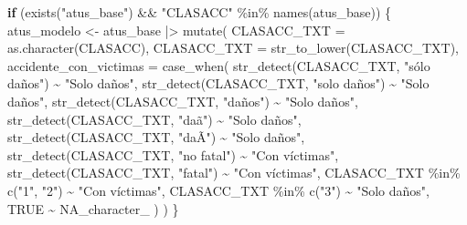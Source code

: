\documentclass[
  11pt,
  letterpaper,
]{book}
\newenvironment{Shaded}{\begin{snugshade}}{\end{snugshade}}
\newcommand{\AttributeTok}[1]{\textcolor[rgb]{0.40,0.45,0.13}{#1}}
\newcommand{\ConstantTok}[1]{\textcolor[rgb]{0.56,0.35,0.01}{#1}}
\newcommand{\ControlFlowTok}[1]{\textcolor[rgb]{0.00,0.23,0.31}{\textbf{#1}}}
\newcommand{\FunctionTok}[1]{\textcolor[rgb]{0.28,0.35,0.67}{#1}}
\newcommand{\NormalTok}[1]{\textcolor[rgb]{0.00,0.23,0.31}{#1}}
\newcommand{\OtherTok}[1]{\textcolor[rgb]{0.00,0.23,0.31}{#1}}
\newcommand{\SpecialCharTok}[1]{\textcolor[rgb]{0.37,0.37,0.37}{#1}}
\newcommand{\StringTok}[1]{\textcolor[rgb]{0.13,0.47,0.30}{#1}}
\begin{document}
\begin{Shaded}
\begin{Highlighting}[]
\ControlFlowTok{if}\NormalTok{ (}\FunctionTok{exists}\NormalTok{(}\StringTok{"atus\_base"}\NormalTok{) }\SpecialCharTok{\&\&} \StringTok{"CLASACC"} \SpecialCharTok{\%in\%} \FunctionTok{names}\NormalTok{(atus\_base)) \{}
\NormalTok{  atus\_modelo }\OtherTok{\textless{}{-}}\NormalTok{ atus\_base }\SpecialCharTok{|\textgreater{}}
    \FunctionTok{mutate}\NormalTok{(}
      \AttributeTok{CLASACC\_TXT =} \FunctionTok{as.character}\NormalTok{(CLASACC),}
      \AttributeTok{CLASACC\_TXT =} \FunctionTok{str\_to\_lower}\NormalTok{(CLASACC\_TXT),}
      \AttributeTok{accidente\_con\_victimas =} \FunctionTok{case\_when}\NormalTok{(}
        \FunctionTok{str\_detect}\NormalTok{(CLASACC\_TXT, }\StringTok{"sólo daños"}\NormalTok{) }\SpecialCharTok{\textasciitilde{}} \StringTok{"Solo daños"}\NormalTok{,}
        \FunctionTok{str\_detect}\NormalTok{(CLASACC\_TXT, }\StringTok{"solo daños"}\NormalTok{) }\SpecialCharTok{\textasciitilde{}} \StringTok{"Solo daños"}\NormalTok{,}
        \FunctionTok{str\_detect}\NormalTok{(CLASACC\_TXT, }\StringTok{"daños"}\NormalTok{) }\SpecialCharTok{\textasciitilde{}} \StringTok{"Solo daños"}\NormalTok{,}
        \FunctionTok{str\_detect}\NormalTok{(CLASACC\_TXT, }\StringTok{"daã"}\NormalTok{) }\SpecialCharTok{\textasciitilde{}} \StringTok{"Solo daños"}\NormalTok{,}
        \FunctionTok{str\_detect}\NormalTok{(CLASACC\_TXT, }\StringTok{"daÃ"}\NormalTok{) }\SpecialCharTok{\textasciitilde{}} \StringTok{"Solo daños"}\NormalTok{,}
        \FunctionTok{str\_detect}\NormalTok{(CLASACC\_TXT, }\StringTok{"no fatal"}\NormalTok{) }\SpecialCharTok{\textasciitilde{}} \StringTok{"Con víctimas"}\NormalTok{,}
        \FunctionTok{str\_detect}\NormalTok{(CLASACC\_TXT, }\StringTok{"fatal"}\NormalTok{) }\SpecialCharTok{\textasciitilde{}} \StringTok{"Con víctimas"}\NormalTok{,}
\NormalTok{        CLASACC\_TXT }\SpecialCharTok{\%in\%} \FunctionTok{c}\NormalTok{(}\StringTok{"1"}\NormalTok{, }\StringTok{"2"}\NormalTok{) }\SpecialCharTok{\textasciitilde{}} \StringTok{"Con víctimas"}\NormalTok{,}
\NormalTok{        CLASACC\_TXT }\SpecialCharTok{\%in\%} \FunctionTok{c}\NormalTok{(}\StringTok{"3"}\NormalTok{) }\SpecialCharTok{\textasciitilde{}} \StringTok{"Solo daños"}\NormalTok{,}
        \ConstantTok{TRUE} \SpecialCharTok{\textasciitilde{}} \ConstantTok{NA\_character\_}
\NormalTok{      )}
\NormalTok{    )}
\NormalTok{\}}
\end{Highlighting}
\end{Shaded}
\end{document}
